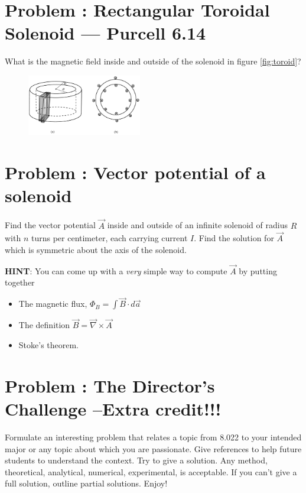 \documentclass[problems]{esg8022pset}
\begin{document}
\section{Problem \thesection: Rectangular Toroidal Solenoid --- Purcell 6.14}

What is the magnetic field inside and outside of the solenoid in figure \autoref{fig:toroid}?

   \begin{figure}[ht]
    \centering
    \includegraphics[width = 5cm]{Toroid}
    \label{fig:toroid}
  \end{figure}

\section{Problem \thesection: Vector potential of a solenoid }
Find the vector
potential $\vec A$ inside and outside of an infinite solenoid of
radius $R$ with $n$ turns per centimeter, each carrying current $I$.
Find the solution for $\vec A$ which is symmetric about the axis of
the solenoid.

{\bf HINT}: You can come up with a {\it very} simple way to compute
$\vec A$ by putting together

\begin{itemize}

\item The magnetic flux, $\Phi_B = \int \vec B\cdot d\vec a$

\item The definition $\vec B = \vec\nabla\times\vec A$

\item Stoke's theorem.
\end{itemize}

\section{Problem \thesection: The Director's Challenge --Extra credit!!!}
Formulate an interesting problem that relates a topic from 8.022  to your intended major or any topic about which you are passionate.
Give references to help future students to understand the context.
Try to give a solution.  Any method, theoretical,  analytical, numerical, experimental, is acceptable. If you can't
 give a full solution, outline partial solutions. Enjoy!
\end{document}
